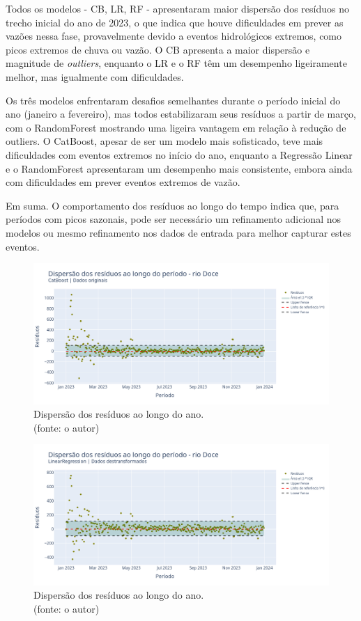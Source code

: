 Todos os modelos - CB, LR, RF - apresentaram maior dispersão dos resíduos no trecho inicial do ano de 2023, o que indica que houve dificuldades em prever as vazões nessa fase, provavelmente devido a eventos hidrológicos extremos, como picos extremos de chuva ou vazão. O CB apresenta a maior dispersão e magnitude de \textit{outliers}, enquanto o LR e o RF têm um desempenho ligeiramente melhor, mas igualmente com dificuldades.

Os três modelos enfrentaram desafios semelhantes durante o período inicial do ano (janeiro a fevereiro), mas todos estabilizaram seus resíduos a partir de março, com o RandomForest mostrando uma ligeira vantagem em relação à redução de outliers. O CatBoost, apesar de ser um modelo mais sofisticado, teve mais dificuldades com eventos extremos no início do ano, enquanto a Regressão Linear e o RandomForest apresentaram um desempenho mais consistente, embora ainda com dificuldades em prever eventos extremos de vazão.

Em suma. O comportamento dos resíduos ao longo do tempo indica que, para períodos com picos sazonais, pode ser necessário um refinamento adicional nos modelos ou mesmo refinamento nos dados de entrada para melhor capturar estes eventos.

\begin{figure}[!h]
	\centering
	\includegraphics[scale=0.33]{Figuras/rio_doce/wfv/CB/CB_WFV_ORIG_RESID_x_TEMPO.png}
	\caption{Dispersão dos resíduos ao longo do ano.\\(fonte: o autor)}
	\label{fig:doce_CB_WFV_ORIG_RESID_x_TEMPO}
\end{figure}

\begin{figure}[!h]
	\centering
	\includegraphics[scale=0.33]{Figuras/rio_doce/wfv/LR/LR_WFV_LOG_RESID_x_TEMPO.png}
	\caption{Dispersão dos resíduos ao longo do ano.\\(fonte: o autor)}
	\label{fig:doce_LR_WFV_LOG_RESID_x_TEMPO}
\end{figure}

